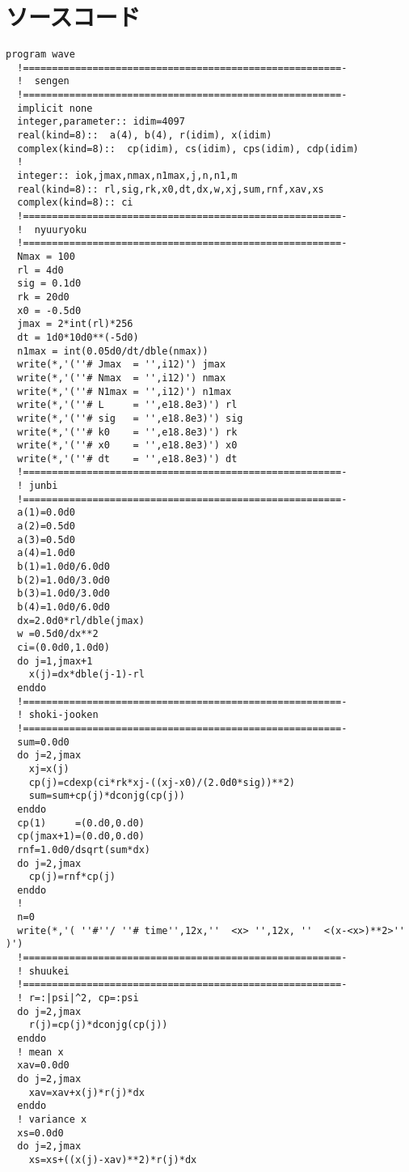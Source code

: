 \appendix
\def\thesection{補遺\Alph{section}}
\renewcommand*{\thelstlisting}{\Alph{section}.\arabic{lstlisting}}
\section{ソースコード}
\begin{lstlisting}[caption=4-Aのソースコード,label=src4a]
program wave
  !=======================================================-
  !  sengen
  !=======================================================-
  implicit none
  integer,parameter:: idim=4097
  real(kind=8)::  a(4), b(4), r(idim), x(idim)
  complex(kind=8)::  cp(idim), cs(idim), cps(idim), cdp(idim)
  !
  integer:: iok,jmax,nmax,n1max,j,n,n1,m
  real(kind=8):: rl,sig,rk,x0,dt,dx,w,xj,sum,rnf,xav,xs
  complex(kind=8):: ci
  !=======================================================-
  !  nyuuryoku
  !=======================================================-
  Nmax = 100
  rl = 4d0
  sig = 0.1d0
  rk = 20d0
  x0 = -0.5d0
  jmax = 2*int(rl)*256
  dt = 1d0*10d0**(-5d0)
  n1max = int(0.05d0/dt/dble(nmax))
  write(*,'(''# Jmax  = '',i12)') jmax
  write(*,'(''# Nmax  = '',i12)') nmax
  write(*,'(''# N1max = '',i12)') n1max
  write(*,'(''# L     = '',e18.8e3)') rl
  write(*,'(''# sig   = '',e18.8e3)') sig
  write(*,'(''# k0    = '',e18.8e3)') rk
  write(*,'(''# x0    = '',e18.8e3)') x0
  write(*,'(''# dt    = '',e18.8e3)') dt
  !=======================================================-
  ! junbi
  !=======================================================-
  a(1)=0.0d0
  a(2)=0.5d0
  a(3)=0.5d0
  a(4)=1.0d0
  b(1)=1.0d0/6.0d0
  b(2)=1.0d0/3.0d0
  b(3)=1.0d0/3.0d0
  b(4)=1.0d0/6.0d0
  dx=2.0d0*rl/dble(jmax)
  w =0.5d0/dx**2
  ci=(0.0d0,1.0d0)
  do j=1,jmax+1
    x(j)=dx*dble(j-1)-rl
  enddo
  !=======================================================-
  ! shoki-jooken
  !=======================================================-
  sum=0.0d0
  do j=2,jmax
    xj=x(j)
    cp(j)=cdexp(ci*rk*xj-((xj-x0)/(2.0d0*sig))**2)
    sum=sum+cp(j)*dconjg(cp(j))
  enddo
  cp(1)     =(0.d0,0.d0)
  cp(jmax+1)=(0.d0,0.d0)
  rnf=1.0d0/dsqrt(sum*dx)
  do j=2,jmax
    cp(j)=rnf*cp(j)
  enddo
  !
  n=0
  write(*,'( ''#''/ ''# time'',12x,''  <x> '',12x, ''  <(x-<x>)**2>'' )')
  !=======================================================-
  ! shuukei
  !=======================================================-
  ! r=:|psi|^2, cp=:psi
  do j=2,jmax
    r(j)=cp(j)*dconjg(cp(j))
  enddo
  ! mean x
  xav=0.0d0
  do j=2,jmax
    xav=xav+x(j)*r(j)*dx
  enddo
  ! variance x
  xs=0.0d0
  do j=2,jmax
    xs=xs+((x(j)-xav)**2)*r(j)*dx

\end{lstlisting}
